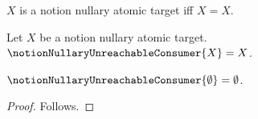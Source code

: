 

\begin{definition}\label{notion_nullary_unreachable_target}
    $X$ is a notion nullary atomic target iff $X=X$.
\end{definition}

\begin{definition}\label{notion_nullary_unreachable_consumer}
    Let $X$ be a notion nullary atomic target.
    $\notionNullaryUnreachableConsumer{X}=X$.
\end{definition}

\begin{proposition}\label{notion_nullary_classification_unreachable}
    $\notionNullaryUnreachableConsumer{\emptyset}=\emptyset$.
\end{proposition}
\begin{proof}
    Follows.
\end{proof}
